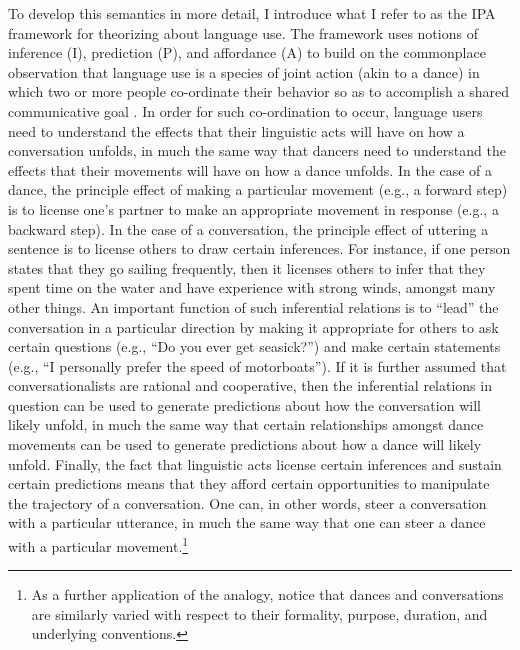 To develop this semantics in more detail, I introduce what I refer to as the IPA framework for theorizing about language use. The framework uses notions of inference (I), prediction (P), and affordance (A) to build on the commonplace observation that language use is a species of joint action (akin to a dance) in which two or more people co-ordinate their behavior so as to accomplish a shared communicative goal \citep{Clark:1996,Lewis:1975,Brandom:2010}. In order for such co-ordination to occur, language users need to understand the effects that their linguistic acts will have on how a conversation unfolds, in much the same way that dancers need to understand the effects that their movements will have on how a dance unfolds. In the case of a dance, the principle effect of making a particular movement (e.g., a forward step) is to license one's partner to make an appropriate movement in response (e.g., a backward step). In the case of a conversation, the principle effect of uttering a sentence is to license others to draw certain inferences. For instance, if one person states that they go sailing frequently, then it licenses others to infer that they spent time on the water and have experience with strong winds, amongst many other things. An important function of such inferential relations is to ``lead'' the conversation in a particular direction by making it appropriate for others to ask certain questions (e.g., ``Do you ever get seasick?'') and make certain statements (e.g., ``I personally prefer the speed of motorboats''). If it is further assumed that conversationalists are rational and cooperative, then the inferential relations in question can be used to generate predictions about how the conversation will likely unfold, in much the same way that certain relationships amongst dance movements can be used to generate predictions about how a dance will likely unfold. Finally, the fact that linguistic acts license certain inferences and sustain certain predictions means that they afford certain opportunities to manipulate the trajectory of a conversation. One can, in other words, steer a conversation with a particular utterance, in much the same way that one can steer a dance with a particular movement.\footnote{As a further application of the analogy, notice that dances and conversations are similarly varied with respect to their formality, purpose, duration, and underlying conventions.}


